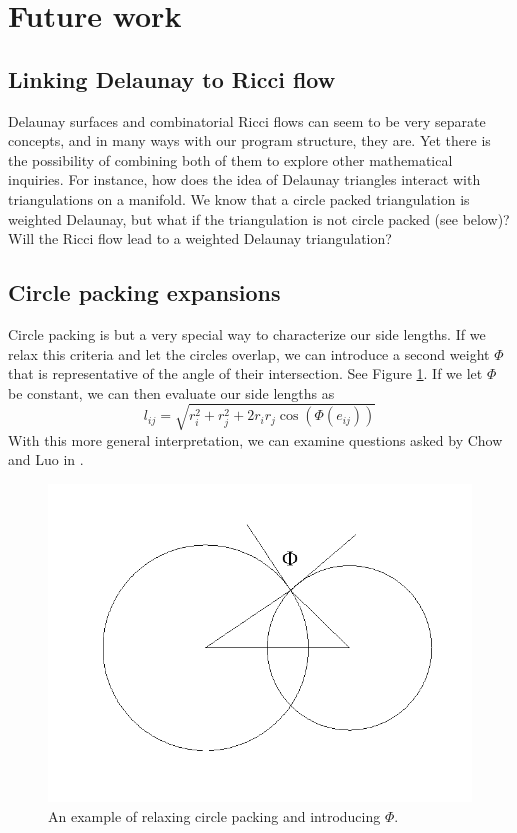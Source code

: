 \documentclass[12pt]{article}
\begin{document}
\section{Future work}
\label{Future}

\subsection{Linking Delaunay to Ricci flow}
Delaunay surfaces and combinatorial Ricci flows can seem to be very separate concepts, and in many ways with our program structure, they are. Yet there is the possibility of combining both of them to explore other mathematical inquiries. For instance, how does the idea of Delaunay triangles interact with triangulations on a manifold. We know that a circle packed triangulation is weighted Delaunay, but what if the triangulation is not circle packed (see below)? Will the Ricci flow lead to a weighted Delaunay triangulation?

\subsection{Circle packing expansions}
\label{circExt}

Circle packing is but a very special way to characterize our side lengths. If we relax this criteria and let the circles overlap, we can introduce a second weight $\Phi$ that is representative of the angle of their intersection. See Figure \ref{fig:intcirc}. If we let $\Phi$ be constant, we can then evaluate our side lengths as $$l_{ij} = \sqrt{r_i^2 + r_j^2 + 2r_ir_j\cos(\Phi(e_{ij}))}$$ With this more general interpretation, we can examine questions asked by Chow and Luo in \cite{chowluo}.

\begin{figure}
\begin{center}
\includegraphics[scale = 0.6]{Pictures/intcirc2.png}
\end{center}
\caption{An example of relaxing circle packing and introducing $\Phi.$}
\label{fig:intcirc}
\end{figure}
\end{document}
